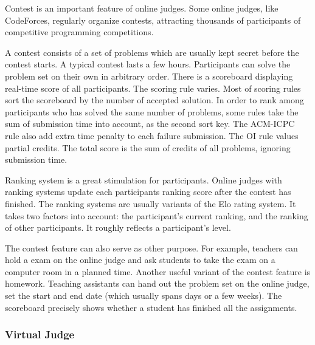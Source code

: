             Contest is an important feature of online judges.
            Some online judges, like CodeForces, regularly organize contests,
            attracting thousands of participants of competitive programming competitions.

            A contest consists of a set of problems
            which are usually kept secret before the contest starts.
            A typical contest lasts a few hours.
            Participants can solve the problem set on their own in arbitrary order.
            There is a scoreboard displaying real-time score of all participants.
            The scoring rule varies.
            Most of scoring rules sort the scoreboard by the number of accepted solution.
            In order to rank among participants who has solved the same number of problems,
            some rules take the sum of submission time into account, as the second sort key.
            The ACM-ICPC rule also add extra time penalty to each failure submission.
            The OI rule values partial credits.
            The total score is the sum of credits of all problems, ignoring submission time.

            Ranking system is a great stimulation for participants.
            Online judges with ranking systems update each participants ranking score
            after the contest has finished.
            The ranking systems are usually variants of the Elo rating system. %
            It takes two factors into account:
            the participant's current ranking, and the ranking of other participants.
            It roughly reflects a participant's level.

            The contest feature can also serve as other purpose.
            For example, teachers can hold a exam on the online judge
            and ask students to take the exam on a computer room in a planned time.
            Another useful variant of the contest feature is homework.
            Teaching assistants can hand out the problem set on the online judge,
            set the start and end date (which usually spans days or a few weeks).
            The scoreboard precisely shows whether a student has finished all the assignments.

        \subsubsection{Virtual Judge} %

